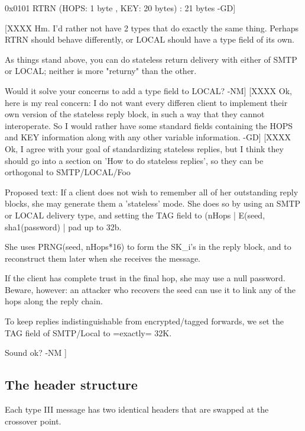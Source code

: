 0x0101 RTRN  (HOPS: 1 byte , KEY: 20 bytes) : 21 bytes -GD]

[XXXX Hm.  I'd rather not have 2 types that do exactly the same thing.
      Perhaps RTRN should behave differently, or LOCAL should have a
      type field of its own.

      As things stand above, you can do stateless return delivery with
      either of SMTP or LOCAL; neither is more "returny" than the other.

      Would it solve your concerns to add a type field to LOCAL? -NM]
[XXXX Ok, here is my real concern: I do not want every differen client
      to implement their own version of the stateless reply block, in
such a way that they cannot interoperate. So I would rather have some 
standard fields containing the HOPS and KEY information along with any
other variable information. -GD]
[XXXX Ok, I agree with your goal of standardizing stateless replies,
      but I think they should go into a section on 'How to do
      stateless replies', so they can be orthogonal to SMTP/LOCAL/Foo  

      Proposed text:
         If a client does not wish to remember all of her outstanding
         reply blocks, she may generate them a 'stateless' mode.  She  
         does so by using an SMTP or LOCAL delivery type, and setting
         the TAG field to 
              (nHops | E(seed, sha1(password) | pad up to 32b.

         She uses PRNG(seed, nHops*16) to form the SK_i's in the reply
         block, and to reconstruct them later when she receives the 
         message.
       
         If the client has complete trust in the final hop, she may
         use a null password.  Beware, however: an attacker who recovers 
         the seed can use it to link any of the hops along the reply 
         chain.

	 To keep replies indistinguishable from encrypted/tagged
         forwards, we set the TAG field of SMTP/Local to =exactly=
         32K.

         Sound ok?                                 -NM ]

\subsection{The header structure}

Each type III message has two identical headers that are swapped at
the crossover point.

